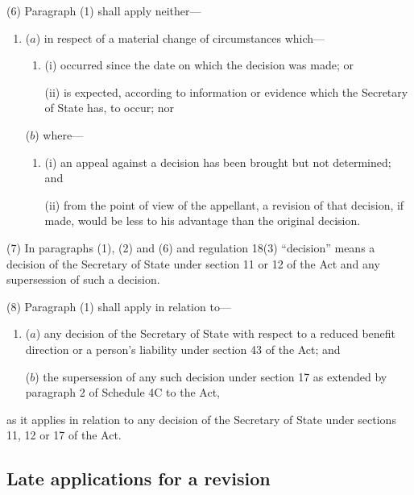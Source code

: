 \documentclass[a4paper,12pt]{article}
\begin{document}
(6) Paragraph (1) shall apply neither---
\begin{enumerate}\item[]
\begin{sloppypar}
($a$) in respect of a material change of circumstances which—
\end{sloppypar}
\begin{enumerate}\item[]
(i) occurred since 
the date on which the decision was made;  %
or

(ii) is expected, according to information or evidence which the Secretary of State has, to occur; nor
\end{enumerate}

($b$) where---
\begin{enumerate}\item[]
(i) an appeal against a decision has been brought but not determined; and

(ii) from the point of view of the appellant, a revision of that decision, if made, would be less to his advantage than the original decision.
\end{enumerate}
\end{enumerate}

(7) In paragraphs (1), (2) and (6) and regulation 18(3) “decision” means a decision of the Secretary of State under section 11 or 12 of the Act and any supersession of such a decision.

(8) Paragraph (1) shall apply in relation to---
\begin{enumerate}\item[]
($a$) any decision of the Secretary of State with respect to a reduced benefit direction or a person’s liability under section 43 of the Act; and

($b$) the supersession of any such decision under section 17 as extended by paragraph 2 of Schedule 4C to the Act,
\end{enumerate}
as it applies in relation to any decision of the Secretary of State under sections 11, 12 or 17 of the Act.


\subsection[18. Late applications for a revision]{Late applications for a revision}
\end{document}

